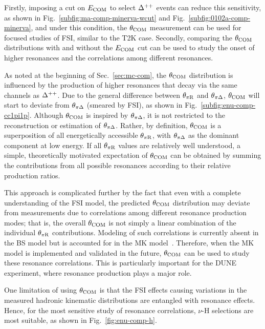      Firstly, imposing a cut on $E_{\textrm{COM}}$ to select $\Delta^{++}$ events can reduce this sensitivity, as shown in Fig.~\ref{subfig:ma-comp-minerva-wcut} and Fig.~\ref{subfig:0102a-comp-minerva}, and under this condition, the $\theta_{\textrm{COM}}$ measurement can be used for focused studies of FSI, similar to the T2K case.
     Secondly, comparing the $\theta_{\textrm{COM}}$ distributions with and without the $E_{\textrm{COM}}$ cut can be used to study the onset of higher resonances and the correlations among different resonances.

     As noted at the beginning of Sec.~\ref{sec:mc-com}, the $\theta_{\textrm{COM}}$ distribution is influenced by the production of higher resonances that decay via the same channels as $\Delta^{++}$.
     Due to the general difference between $\theta_{\pi\textrm{R}}$ and $\theta_{\pi\Delta}$, $\theta_{\textrm{COM}}$ will start to deviate from $\theta_{\pi\Delta}$ (smeared by FSI), as shown in Fig.~\ref{subfig:enu-comp-cc1pi1p}.
     Although $\theta_{\textrm{COM}}$ is inspired by $\theta_{\pi\Delta}$, it is not restricted to the reconstruction or estimation of $\theta_{\pi\Delta}$. 
     Rather, by definition, $\theta_{\textrm{COM}}$ is a superposition of all energetically accessible $\theta_{\pi\textrm{R}}$, with $\theta_{\pi\Delta}$ as the dominant component at low energy.
     If all $\theta_{\pi\textrm{R}}$ values are relatively well understood, a simple, theoretically motivated expectation of $\theta_{\textrm{COM}}$ can be obtained by summing the contributions from all possible resonances according to their relative production ratios.

     This approach is complicated further by the fact that even with a complete understanding of the FSI model, the predicted $\theta_{\textrm{COM}}$ distribution may deviate from measurements due to correlations among different resonance production modes; that is, the overall $\theta_{\textrm{COM}}$ is not simply a linear combination of the individual $\theta_{\pi\textrm{R}}$ contributions.
     Modeling of such correlations is currently absent in the BS model but is accounted for in the MK model~\cite{Kabirnezhad:2017jmf,Kabirnezhad:2020wtp,Kabirnezhad:2022znc}.
     Therefore, when the MK model is implemented and validated in the future, $\theta_{\textrm{COM}}$ can be used to study these resonance correlations.
     This is particularly important for the DUNE experiment, where resonance production plays a major role.

     One limitation of using $\theta_{\textrm{COM}}$ is that the FSI effects causing variations in the measured hadronic kinematic distributions are entangled with resonance effects.
     Hence, for the most sensitive study of resonance correlations, $\nu$-H selections are most suitable, as shown in Fig.~\ref{fig:enu-comp-h}.

